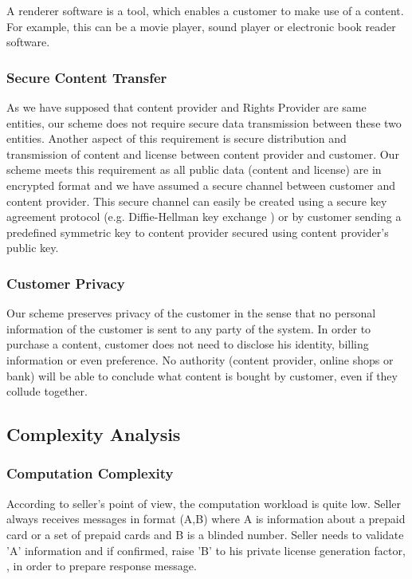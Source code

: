 \documentclass[times]{secauth}
\begin{document}
A renderer software is a tool, which enables a customer to make use of a content. For example, this can be a movie player, sound player or electronic book reader software.

\subsubsection{Secure Content Transfer}
As we have supposed that content provider and Rights Provider are same entities, our scheme does not require secure data transmission between these two entities.
Another aspect of this requirement is secure distribution and transmission of content and license between content provider and customer. Our scheme meets this requirement as all public data (content and license) are in encrypted format and we have assumed a secure channel between customer and content provider. This secure channel can easily be created using a secure key agreement protocol (e.g. Diffie-Hellman key exchange \cite{N40}) or by customer sending a predefined symmetric key to content provider secured using content provider's public key.


\subsubsection{Customer Privacy}
Our scheme preserves privacy of the customer in the sense that no personal information of the customer is sent to any party of the system. In order to purchase a content, customer does not need to disclose his identity, billing information or even preference. No authority (content provider, online shops or bank) will be able to conclude what content is bought by customer, even if they collude together.

\subsection{Complexity Analysis}
\label{sec:complexity}
\subsubsection{Computation Complexity}
According to seller's point of view, the computation workload is quite low. Seller always receives messages in format (A,B) where A is information about a prepaid card or a set of prepaid cards and B is a blinded number. Seller needs to validate 'A' information and if confirmed, raise 'B' to his private license generation factor, , in order to prepare response message. 
\end{document}
